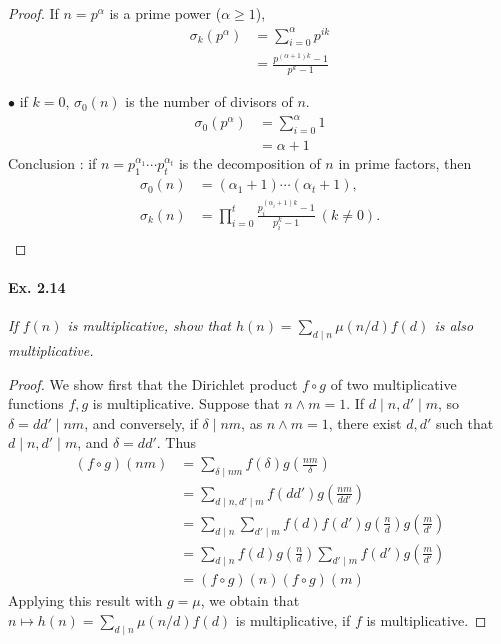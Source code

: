 \documentclass[11pt,a4paper]{article}
\begin{document}
{\begin{proof}
If $n = p^\alpha$ is a prime power ($\alpha \geq 1$),
\begin{align*}
\sigma_k(p^\alpha) &= \sum_{i=0}^{\alpha} p^{ik}\\
&=\frac{ p^{(\alpha+1)k} -  1}{p^k-1}
\end{align*}


$\bullet$ if $k=0$, $\sigma_0(n)$ is the number of divisors of $n$.
\begin{align*}
\sigma_0(p^\alpha) &= \sum_{i=0}^{\alpha} 1\\
&=\alpha+1
\end{align*}
Conclusion : if $n = p_1^{\alpha_1}\cdots p_t^{\alpha_t}$ is the decomposition of $n$ in prime factors, then
\begin{align*}
\sigma_0(n) &= (\alpha_1+1)\cdots(\alpha_t +1),\\
\sigma_k(n) &= \prod_{i=0}^t \frac{p_i^{(\alpha_i+1)k}- 1}{p_i^k - 1}\ (k\ne 0).\\
\end{align*}
\end{proof}

\paragraph{Ex. 2.14}

{\it If $f(n)$ is multiplicative, show that $h(n) = \sum_{d \mid n} \mu(n/d)f(d)$ is also multiplicative.
}

\begin{proof}
We show first that the Dirichlet product $f \circ g$ of two multiplicative functions $f,g$ is multiplicative.
Suppose that $n\wedge m = 1$. If $d\mid n, d'\mid m$, so $\delta = dd' \mid nm$, and conversely, if $\delta \mid nm$, as $n\wedge m = 1$, there exist $d,d'$ such that $d\mid n,d'\mid m$, and $\delta = dd'$. Thus
\begin{align*}
(f\circ g)(nm)&= \sum_{\delta \mid nm} f(\delta) g\left(\frac{nm}{\delta}\right)\\
&=\sum_{d\mid n,d'\mid m} f(dd')g\left(\frac{nm}{dd'}\right)\\
&=\sum_{d\mid n} \sum_{d'\mid m} f(d)f(d') g\left(\frac{n}{d}\right)g\left(\frac{m}{d'}\right)\\
&=\sum_{d\mid n} f(d)g\left(\frac{n}{d}\right)\sum_{d'\mid m} f(d') g\left(\frac{m}{d'}\right)\\
&=(f\circ g)(n)(f\circ g)(m)
\end{align*}
Applying this result with $g = \mu$, we obtain that $n\mapsto h(n) = \sum_{d \mid n} \mu(n/d)f(d)$ is multiplicative, if $f$ is multiplicative.
\end{proof}

}
\end{document}
